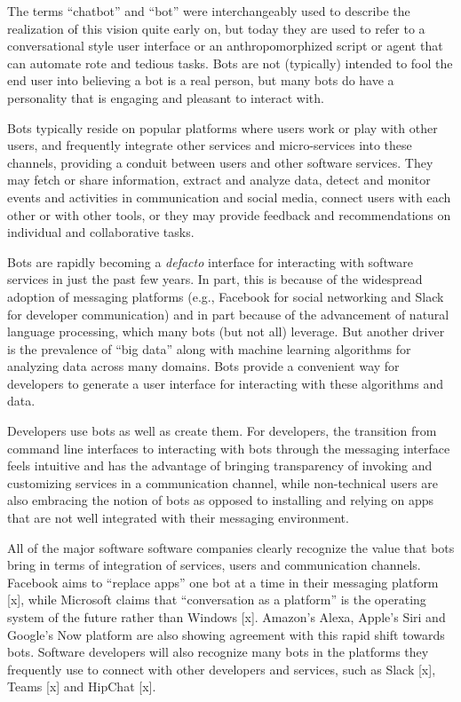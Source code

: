 \documentclass{sig-alternate}
\begin{document}
The terms ``chatbot'' and ``bot'' were interchangeably used to describe the realization of this vision quite early on, but today they are used to refer to a conversational style user interface or an anthropomorphized script or agent that can automate rote and tedious tasks.
Bots are not (typically) intended to fool the end user into believing a bot is a real person, but many bots do have a personality that is engaging and pleasant to interact with. 
 
Bots typically reside on popular platforms where users work or play with other users, and frequently integrate other services and micro-services into these channels, providing a conduit between users and other software services. 
They may fetch or share information, extract and analyze data, detect and monitor events and activities in communication and social media, connect users with each other or with other tools, or they may provide feedback and recommendations on individual and collaborative tasks. 

Bots are rapidly becoming a \emph{defacto} interface for interacting with software services in just the past few years.  In part, this is because of the widespread adoption of messaging platforms (e.g., Facebook for social networking and Slack for developer communication) and in part because of the advancement of natural language processing, which many bots (but not all) leverage.
But another driver is the prevalence of ``big data'' along with machine learning algorithms for analyzing data across many domains.  Bots provide a convenient way for developers to generate a user interface for interacting with these algorithms and data. 

Developers use bots as well as create them. For developers, the transition from command line interfaces to interacting with bots through the messaging interface feels intuitive and has the advantage of bringing transparency of invoking and customizing services in a communication channel, while non-technical users are also embracing the notion of bots as opposed to installing and relying on apps that are not well integrated with their messaging environment.  

All of the major software software companies clearly recognize the value that bots bring in terms of integration of services, users and communication channels. Facebook aims to ``replace apps'' one bot at a time in their messaging platform [x], while Microsoft claims that ``conversation as a platform'' is the operating system of the future rather than Windows [x]. 
Amazon's Alexa, Apple's Siri and Google's Now platform are also showing agreement with this rapid shift towards bots.
Software developers will also recognize many bots in the platforms they frequently use to connect with other developers and services, such as Slack [x], Teams [x] and HipChat [x]. 
\end{document}
